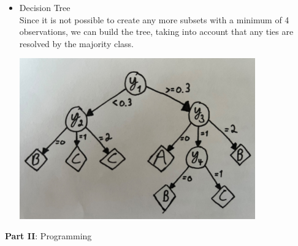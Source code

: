 \documentclass[12pt]{article}
\begin{document}
\begin{enumerate}[leftmargin=\labelsep, label=\textbf{\arabic*.)}]
\begin{itemize}
              \item Decision Tree \\
                    Since it is not possible to create any more subsets with a minimum of 4 observations, we can build the tree, taking into account that any ties are resolved by the majority class. \\
                    \begin{center}
                        \includegraphics[width=0.8\textwidth]{decision_tree_pen_and_paper.jpg}
                    \end{center}
          \end{itemize}
\end{enumerate}

\large{\textbf{Part II}: Programming}\normalsize
\end{document}
